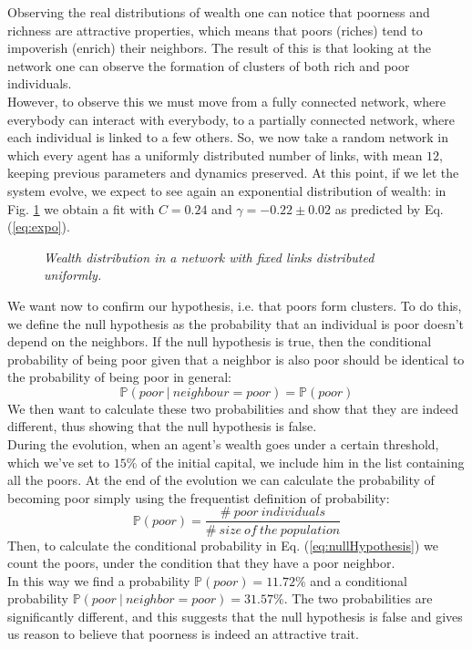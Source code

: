 Observing the real distributions of wealth one can notice that poorness and richness are attractive properties, which means that poors (riches) tend to impoverish (enrich) their neighbors.
The result of this is that looking at the network one can observe the formation of clusters of both rich and poor individuals. \\
However, to observe this we must move from a fully connected network, where everybody can interact with everybody, to a partially connected network, where each individual is linked to a few others.
So, we now take a random network in which every agent has a uniformly distributed number of links, with mean $12$, keeping previous parameters and dynamics preserved.
At this point, if we let the system evolve, we expect to see again an exponential distribution of wealth: in Fig. \ref{fig:fixedExpo} we obtain a fit with $C = 0.24$ and $\gamma = -0.22 \pm 0.02$ as predicted by Eq. (\ref{eq:expo}).
\begin{figure}[H]
    \centering
    \scalebox{.7}{}
    \caption{\emph{Wealth distribution in a network with fixed links distributed uniformly.}}
    \label{fig:fixedExpo}
\end{figure}
We want now to confirm our hypothesis, i.e. that poors form clusters.
To do this, we define the null hypothesis as the probability that an individual is poor doesn't depend on the neighbors.
If the null hypothesis is true, then the conditional probability of being poor given that a neighbor is also poor should be identical to the probability of being poor in general:
\begin{equation}
    \mathbb{P}(poor \ | \ neighbour=poor) = \mathbb{P}(poor)
	\label{eq:nullHypothesis}
\end{equation}
We then want to calculate these two probabilities and show that they are indeed different, thus showing that the null hypothesis is false. \\
During the evolution, when an agent's wealth goes under a certain threshold, which we've set to $15 \%$ of the initial capital, we include him in the list containing all the poors.
At the end of the evolution we can calculate the probability of becoming poor simply using the frequentist definition of probability:
$$
	\mathbb{P}(poor) = \frac{\# \ poor \ individuals}{\# \ size \ of \ the \ population}
$$
Then, to calculate the conditional probability in Eq. (\ref{eq:nullHypothesis}) we count the poors, under the condition that they have a poor neighbor. \\
In this way we find a probability $\mathbb{P}(poor) = 11.72 \%$ and a conditional probability $\mathbb{P}(poor \ | \ neighbor=poor) = 31.57 \%$.
The two probabilities are significantly different, and this suggests that the null hypothesis is false and gives us reason to believe that poorness is indeed an attractive trait.
